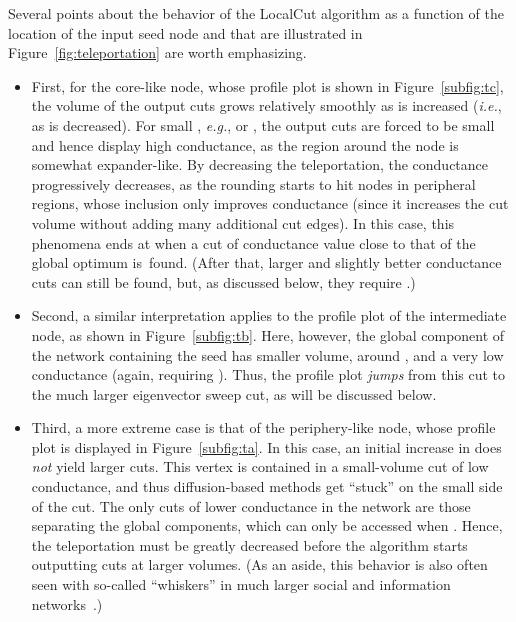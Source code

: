 \documentclass[11pt]{article}
\begin{document}
Several points about the behavior of the \textsf{LocalCut} algorithm as a 
function of the location of the input seed node and that are illustrated in 
Figure~\ref{fig:teleportation} are worth emphasizing.
\begin{itemize}
\item
First, for the core-like node, whose profile plot is shown in 
Figure~\ref{subfig:tc}, the volume of the output cuts grows relatively 
smoothly as  is increased (\emph{i.e.}, as  is decreased). 
For small , \emph{e.g.},  or , the 
output cuts are forced to be small and hence display high conductance, as 
the region around the node is somewhat expander-like. 
By decreasing the teleportation, the conductance progressively decreases, 
as the rounding starts  to hit nodes in peripheral regions, whose inclusion only improves 
conductance (since it increases the cut volume without adding many 
additional cut edges).
In this case, this phenomena ends at  when a cut 
of conductance value close to that of the global optimum is~found. 
(After that, larger and slightly better conductance cuts can still be found, 
but, as discussed below, they require .)
\item
Second, a similar interpretation applies to the profile plot of the 
intermediate node, as shown in Figure~\ref{subfig:tb}. 
Here, however, the global component of the network containing the seed has 
smaller volume, around , and a very low conductance (again, requiring 
).
Thus, the profile plot \emph{jumps} from this cut to the much larger 
eigenvector sweep cut, as will be discussed below.
\item
Third, a more extreme case is that of the periphery-like node, whose profile 
plot is displayed in Figure~\ref{subfig:ta}. 
In this case, an initial increase in  does \emph{not} yield larger cuts.
This vertex is contained in a small-volume cut of low conductance, and thus
diffusion-based methods get ``stuck'' on the small side of the cut.
The only cuts of lower conductance in the network are those separating the 
global components, which can only be accessed when . 
Hence, the teleportation must be greatly decreased before the algorithm 
starts outputting cuts at larger volumes.
(As an aside, this behavior is also often seen with so-called ``whiskers'' 
in much larger social and information 
networks~\cite{LLDM08_communities_CONF,LLDM09_communities_IM,LLM10_communities_CONF}.) 
\end{itemize}
\end{document}
